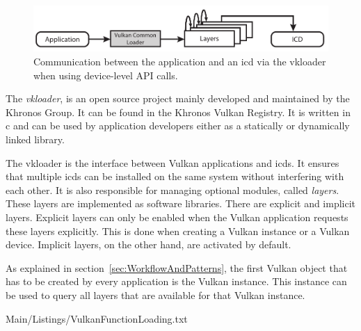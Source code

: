     \begin{figure}
      \includegraphics{Main/Images/VulkanLoaderDeviceLayers}
      \centering
      \caption{Communication between the application and an \gls{icd} via the \gls{vkloader} when using device-level API calls.}
      \label{fig:VulkanLoaderWithDeviceLayers}
    \end{figure}

    The \textit{\gls{vkloader}}, is an open source project mainly developed and maintained by the Khronos Group. It can be found in the Khronos Vulkan Registry\cite{vulkanregistry}. It is written in \gls{c} and can be used by application developers either as a statically or dynamically linked library.

    The \gls{vkloader} is the interface between Vulkan applications and \glspl{icd}. It ensures that multiple \glspl{icd} can be installed on the same system without interfering with each other. It is also responsible for managing optional modules, called \textit{layers}. These layers are implemented as software libraries. There are explicit and implicit layers. Explicit layers can only be enabled when the Vulkan application requests these layers explicitly. This is done when creating a Vulkan instance or a Vulkan device. Implicit layers, on the other hand, are activated by default.


    As explained in section~\ref{sec:WorkflowAndPatterns}, the first Vulkan object that has to be created by every application is the Vulkan instance. This instance can be used to query all layers that are available for that Vulkan instance.

    
    {Main/Listings/VulkanFunctionLoading.txt}

